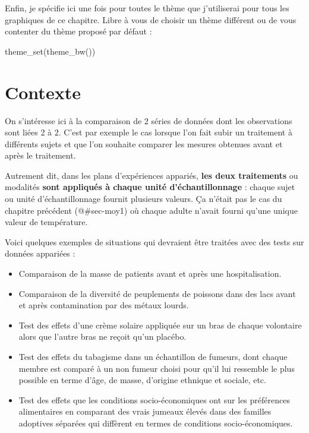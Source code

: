\documentclass[
  a4paper,
  DIV=11,
  numbers=noendperiod,
  oneside]{scrreprt}
\newenvironment{Shaded}{}{}
\newcommand{\FunctionTok}[1]{\textcolor[rgb]{0.44,0.26,0.76}{#1}}
\newcommand{\NormalTok}[1]{\textcolor[rgb]{0.14,0.16,0.18}{#1}}
\providecommand{\tightlist}{%
  \setlength{\itemsep}{0pt}\setlength{\parskip}{0pt}}\usepackage{longtable,booktabs,array}
\begin{document}
Enfin, je spécifie ici une fois pour toutes le thème que j'utiliserai
pour tous les graphiques de ce chapitre. Libre à vous de choisir un
thème différent ou de vous contenter du thème proposé par défaut :

\begin{Shaded}
\begin{Highlighting}[]
\FunctionTok{theme\_set}\NormalTok{(}\FunctionTok{theme\_bw}\NormalTok{())}
\end{Highlighting}
\end{Shaded}

\hypertarget{contexte-1}{%
\section{Contexte}\label{contexte-1}}

On s'intéresse ici à la comparaison de 2 séries de données dont les
observations sont liées 2 à 2. C'est par exemple le cas lorsque l'on
fait subir un traitement à différents sujets et que l'on souhaite
comparer les mesures obtenues avant et après le traitement.

Autrement dit, dans les plans d'expériences appariés, \textbf{les deux
traitements} ou modalités \textbf{sont appliqués à chaque unité
d'échantillonnage} : chaque sujet ou unité d'échantillonnage fournit
plusieurs valeurs. Ça n'était pas le cas du chapitre précédent
(@\#sec-moy1) où chaque adulte n'avait fourni qu'une unique valeur de
température.

Voici quelques exemples de situations qui devraient être traitées avec
des tests sur données appariées :

\begin{itemize}
\tightlist
\item
  Comparaison de la masse de patients avant et après une
  hospitalisation.
\item
  Comparaison de la diversité de peuplements de poissons dans des lacs
  avant et après contamination par des métaux lourds.
\item
  Test des effets d'une crème solaire appliquée sur un bras de chaque
  volontaire alors que l'autre bras ne reçoit qu'un placébo.
\item
  Test des effets du tabagisme dans un échantillon de fumeurs, dont
  chaque membre est comparé à un non fumeur choisi pour qu'il lui
  ressemble le plus possible en terme d'âge, de masse, d'origine
  ethnique et sociale, etc.
\item
  Test des effets que les conditions socio-économiques ont sur les
  préférences alimentaires en comparant des vrais jumeaux élevés dans
  des familles adoptives séparées qui diffèrent en termes de conditions
  socio-économiques.
\end{itemize}
\end{document}
